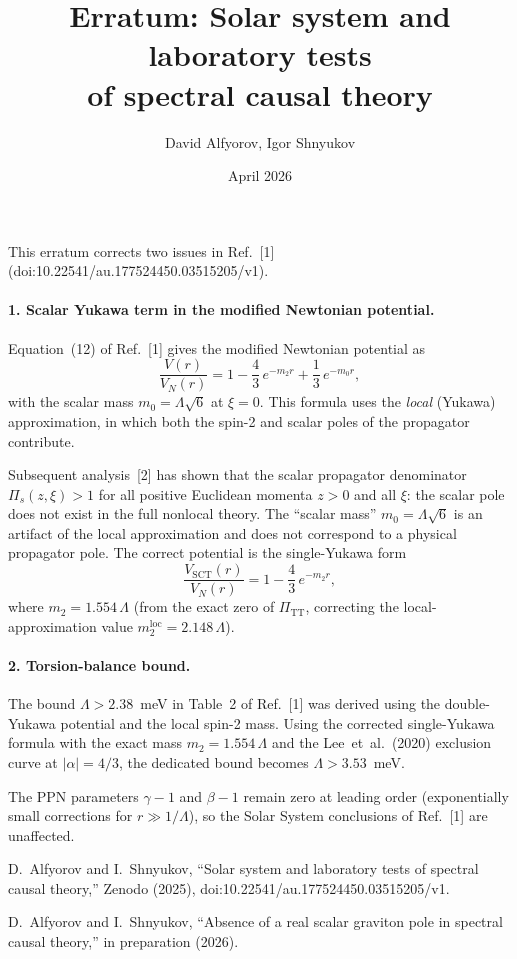 \documentclass[12pt,a4paper]{article}
\title{\textbf{Erratum: Solar system and laboratory tests\\
of spectral causal theory}}
\author{David Alfyorov, Igor Shnyukov}
\date{April 2026}
\begin{document}
\maketitle

This erratum corrects two issues in Ref.~[1]
(doi:10.22541/au.177524450.03515205/v1).

\paragraph{1. Scalar Yukawa term in the modified Newtonian potential.}
Equation~(12) of Ref.~[1] gives the modified Newtonian potential as
\begin{equation}
  \frac{V(r)}{V_N(r)} = 1 - \frac{4}{3}\,e^{-m_2 r} + \frac{1}{3}\,e^{-m_0 r},
\end{equation}
with the scalar mass $m_0 = \Lambda\sqrt{6}$ at $\xi = 0$.
This formula uses the \emph{local} (Yukawa) approximation, in which
both the spin-2 and scalar poles of the propagator contribute.

Subsequent analysis~[2] has shown that the scalar propagator
denominator $\Pi_s(z,\xi) > 1$ for all positive Euclidean momenta
$z > 0$ and all $\xi$: the scalar pole does not exist in the full
nonlocal theory. The ``scalar mass'' $m_0 = \Lambda\sqrt{6}$ is an
artifact of the local approximation and does not correspond to a
physical propagator pole. The correct potential is the single-Yukawa
form
\begin{equation}
  \frac{V_{\mathrm{SCT}}(r)}{V_N(r)} = 1 - \frac{4}{3}\,e^{-m_2 r},
\end{equation}
where $m_2 = 1.554\,\Lambda$ (from the exact zero of $\Pi_{\mathrm{TT}}$,
correcting the local-approximation value $m_2^{\mathrm{loc}} = 2.148\,\Lambda$).

\paragraph{2. Torsion-balance bound.}
The bound $\Lambda > 2.38$~meV in Table~2 of Ref.~[1] was derived
using the double-Yukawa potential and the local spin-2 mass.
Using the corrected single-Yukawa formula with the exact mass
$m_2 = 1.554\,\Lambda$ and the Lee~et~al.\ (2020) exclusion curve
at $|\alpha| = 4/3$, the dedicated bound becomes
$\Lambda > 3.53$~meV.

The PPN parameters $\gamma - 1$ and $\beta - 1$ remain zero at
leading order (exponentially small corrections for $r \gg 1/\Lambda$),
so the Solar System conclusions of Ref.~[1] are unaffected.

\bigskip
\noindent [1] D.~Alfyorov and I.~Shnyukov,
``Solar system and laboratory tests of spectral causal theory,''
Zenodo (2025), doi:10.22541/au.177524450.03515205/v1.

\noindent [2] D.~Alfyorov and I.~Shnyukov,
``Absence of a real scalar graviton pole in spectral causal theory,''
in preparation (2026).
\end{document}
